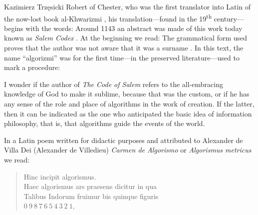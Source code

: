 \begin{artengenv}{Kazimierz Trzęsicki}
Robert of Chester, who was the first translator into Latin of the now-lost book al-Khwarizmi \parencite[p.411]{Menninger1969}, his translation---found in the 19\textsuperscript{th} century---begins with the words:  Around 1143 \parencite[p.411]{Menninger1958} an abstract was made of this work today known as \emph{Salem Codex}  \parencite{Cantor1865}. At the beginning we read:  The grammatical form used proves that the author was not aware that it was a surname \parencite[p.14, footnote 1]{Cantor1865}. In this text, the name ``algorizmi'' was for the first time---in the preserved literature---used to mark a procedure: 

I wonder if the author of \emph{The Code of Salem} refers to the all-embracing knowledge of God to make it sublime, because that was the custom, or if he has any sense of the role and place of algorithms in the work of creation. If the latter, then it can be indicated as the one who anticipated the basic idea of information philosophy, that is, that algorithms guide the events of the world.


In a Latin poem written for didactic purposes and attributed to Alexander de Villa Dei (Alexander de Villedieu) \emph{Carmen de Algorismo} or \emph{Algorismus metricus} \parencite*[printed edition][p.73]{alexander-villedieu_carmen_1839}
we read: {\small \begin{verse}
Hinc incipit algorismus. \\
Haec algorismus ars praesens dicitur in qua \\
Talibus Indorum fruimur bis quinque figuris \\
$ 0 \ 9 \ 8 \ 7 \ 6 \ 5 \ 4 \ 3 \ 2 \ 1 $, \\

\smallskip
\end{verse}}


\end{artengenv}
